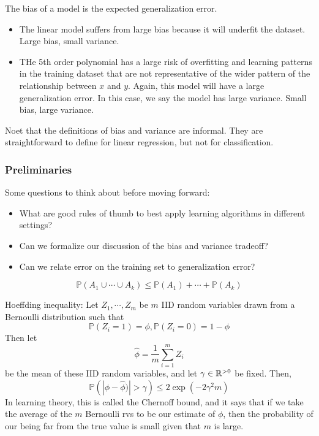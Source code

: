 \documentclass[12pt]{scrartcl}
\begin{document}
\begin{definition}
    The bias of a model is the expected generalization error.
\end{definition}
\begin{itemize}
    \item The linear model suffers from large bias because it will underfit the dataset. Large bias, small variance.
    \item THe 5th order polynomial has a large risk of overfitting and learning patterns in the training dataset that are not representative of the wider pattern of the relationship between $x$ and $y$. Again, this model will have a large generalization error. In this case, we say the model has large variance. Small bias, large variance.
\end{itemize}

\begin{note}
    Noet that the definitions of bias and variance are informal. They are straightforward to define for linear regression, but not for classification.
\end{note}

\subsubsection{Preliminaries}

Some questions to think about before moving forward:
\begin{itemize}
    \item What are good rules of thumb to best apply learning algorithms in different settings?
    \item Can we formalize our discussion of the bias and variance tradeoff?
    \item Can we relate error on the training set to generalization error?
\end{itemize}

\begin{lemma}
    \[\mathbb{P}(A_1 \cup \cdots \cup A_k) \leq \mathbb{P}(A_1) + \cdots + \mathbb{P}(A_k)\]
\end{lemma}
\begin{lemma}
    Hoeffding inequality: Let $Z_1, \cdots, Z_m$ be $m$ IID random variables drawn from a Bernoulli distribution such that 
    \[\mathbb{P}(Z_i = 1) = \phi, \mathbb{P}(Z_i = 0) = 1 - \phi\]
    Then let \[\hat{\phi} = \frac{1}{m}\sum_{i=1}^m Z_i\] be the mean of these IID random variables, and let $\gamma \in \mathbb R^{>0}$ be fixed. Then, 
    \[\mathbb{P}(|\phi-\hat \phi)| > \gamma) \leq 2 \exp(-2\gamma^2m)\]
    In learning theory, this is called the Chernoff bound, and it says that if we take the average of the $m$ Bernoulli rvs to be our estimate of $\phi$, then the probability of our being far from the true value is small given that $m$ is large. 
\end{lemma}
\end{document}
